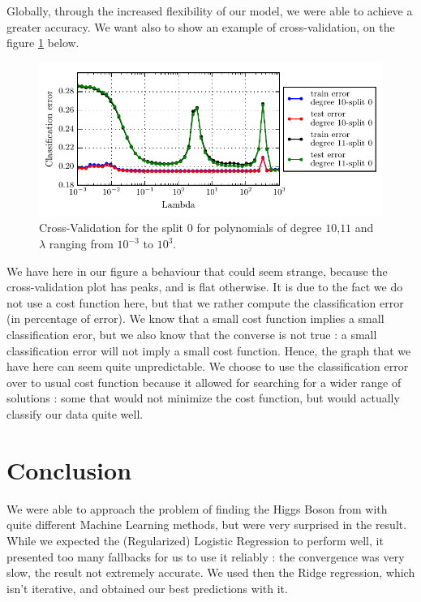 \documentclass[10pt,conference,compsocconf]{IEEEtran}
\begin{document}
Globally, through the increased flexibility of our model, we were able to achieve a greater accuracy. We want also to show an example of cross-validation, on the figure \ref{fig:cross-validation} below.

\begin{figure}[!ht]
	\centering
	\includegraphics[scale=.7]{Cross_validation_10_11}
	\caption{Cross-Validation for the split $0$ for polynomials of degree $10$,$11$ and $\lambda$ ranging from $10^{-3}$ to $10^3$.}
	\label{fig:cross-validation}
\end{figure}

We have here in our figure a behaviour that could seem strange, because the cross-validation plot has peaks, and is flat otherwise. It is due to the fact we do not use a cost function here, but that we rather compute the classification error (in percentage of error). We know that a small cost function implies a small classification eror, but we also know that the converse is not true : a small classification error will not imply a small cost function. Hence, the graph that we have here can seem quite unpredictable. We choose to use the classification error over to usual cost function because it allowed for searching for a wider range of solutions : some that would not minimize the cost function, but would actually classify our data quite well.
\section{Conclusion}
We were able to approach the problem of finding the Higgs Boson from with quite different Machine Learning methods, but were very surprised in the result. While we expected the (Regularized) Logistic Regression to perform well, it presented too many fallbacks for us to use it reliably : the convergence was very slow, the result not extremely accurate. We used then the Ridge regression, which isn't iterative, and obtained our best predictions with it.
\end{document}
